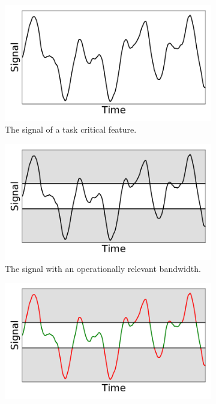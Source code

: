 \begin{figure}[p]
    \begin{center}
        \begin{subfigure}{0.7\linewidth}
            \includegraphics[width=\linewidth]{figures/Introduction/signal.pdf}
            \caption[The signal of a task critical feature]{The signal of a task critical feature.}
            \label{fig:signal}
        \end{subfigure}\hfill
        \begin{subfigure}{0.7\linewidth}
            \includegraphics[width=\linewidth]{figures/Introduction/signal_w_bandwidth.pdf}
            \caption[The signal with an operationally relevant bandwidth]{The signal with an operationally relevant bandwidth.}
            \label{fig:signal_w_bandwidth}
        \end{subfigure}\hfill
        \begin{subfigure}{0.7\linewidth}
            \includegraphics[width=\linewidth]{figures/Introduction/signal_w_feedback.pdf}

\end{subfigure}
\end{center}
\end{figure}
